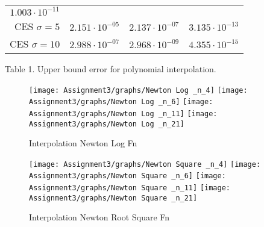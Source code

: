 \documentclass[]{article}
\begin{document}
\begin{longtable}[]{@{}rrrr@{}}
\begin{minipage}[t]{0.26\columnwidth}
\(1.003 \cdot 10^{-11}\)\strut
\end{minipage}\tabularnewline
\begin{minipage}[t]{0.10\columnwidth}\raggedleft
CES \(\sigma=5\)\strut
\end{minipage} & \begin{minipage}[t]{0.26\columnwidth}\raggedleft
\(2.151 \cdot 10^{-05}\)\strut
\end{minipage} & \begin{minipage}[t]{0.26\columnwidth}\raggedleft
\(2.137 \cdot 10^{-07}\)\strut
\end{minipage} & \begin{minipage}[t]{0.26\columnwidth}\raggedleft
\(3.135 \cdot 10^{-13}\)\strut
\end{minipage}\tabularnewline
\begin{minipage}[t]{0.10\columnwidth}\raggedleft
CES \(\sigma=10\)\strut
\end{minipage} & \begin{minipage}[t]{0.26\columnwidth}\raggedleft
\(2.988 \cdot 10^{-07}\)\strut
\end{minipage} & \begin{minipage}[t]{0.26\columnwidth}\raggedleft
\(2.968 \cdot 10^{-09}\)\strut
\end{minipage} & \begin{minipage}[t]{0.26\columnwidth}\raggedleft
\(4.355 \cdot 10^{-15}\)\strut
\end{minipage}\tabularnewline
\bottomrule
\end{longtable}

Table 1. Upper bound error for polynomial interpolation.

\begin{figure}

{\centering \texttt{[image: Assignment3/graphs/Newton Log \_n\_4]} \texttt{[image: Assignment3/graphs/Newton Log \_n\_6]} \texttt{[image: Assignment3/graphs/Newton Log \_n\_11]} \texttt{[image: Assignment3/graphs/Newton Log \_n\_21]} 

}

\caption{Interpolation Newton Log Fn}\label{fig:unnamed-chunk-7}
\end{figure}

\begin{figure}

{\centering \texttt{[image: Assignment3/graphs/Newton Square \_n\_4]} \texttt{[image: Assignment3/graphs/Newton Square \_n\_6]} \texttt{[image: Assignment3/graphs/Newton Square \_n\_11]} \texttt{[image: Assignment3/graphs/Newton Square \_n\_21]} 

}

\caption{Interpolation Newton Root Square Fn}\label{fig:unnamed-chunk-8}
\end{figure}
\end{document}
